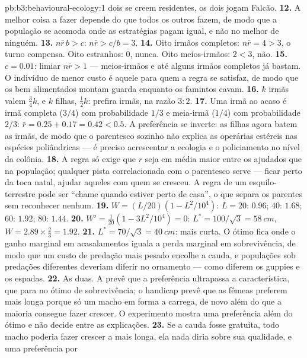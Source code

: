 \begin{solution}{pb:b3:behavioural-ecology:1}
dois se creem residentes, os dois jogam Falcão.
\textbf{12.} A melhor coisa a fazer depende do que todos os outros fazem,
de modo que a população se acomoda onde as estratégias pagam igual, e não
no melhor de ninguém.
\textbf{13.} $n\bar r\,b > c$: $n\bar r > c/b = 3$.
\textbf{14.} Oito irmãos completos: $n\bar r = 4 > 3$, o turno compensa.
Oito estranhos: $0$, nunca. Oito meios-irmãos: $2 < 3$, não.
\textbf{15.} $c = 0.01$: limiar $n\bar r > 1$ --- meios-irmãos e até
alguns irmãos completos já bastam. O indivíduo de menor custo é aquele
para quem a regra se satisfaz, de modo que os bem alimentados montam
guarda enquanto os famintos cavam.
\textbf{16.} $k$ irmãs valem $\tfrac{3}{4}k$, e $k$ filhas,
$\tfrac{1}{2}k$: prefira irmãs, na razão $3{:}2$.
\textbf{17.} Uma irmã ao acaso é irmã completa ($3/4$) com probabilidade
$1/3$ e meia-irmã ($1/4$) com probabilidade $2/3$: $\bar r = 0.25 +
0.17 = 0.42 < 0.5$. A preferência se inverte: as filhas agora batem as irmãs,
de modo que o parentesco sozinho não explica as operárias estéreis nas
espécies poliândricas --- é preciso acrescentar a ecologia e o
policiamento no nível da colônia.
\textbf{18.} A regra só exige que $r$ seja em média maior entre os
ajudados que na população; qualquer pista correlacionada com o parentesco
serve --- ficar perto da toca natal, ajudar aqueles com quem se cresceu.
A regra de um esquilo-terrestre pode ser ``chame quando estiver perto de
casa'', o que separa os parentes sem reconhecer nenhum.
\textbf{19.} $W = (L/20)(1 - L^{2}/10^{4})$: $L = 20$: $0.96$; $40$:
$1.68$; $60$: $1.92$; $80$: $1.44$.
\textbf{20.} $W' = \tfrac{1}{20}(1 - 3L^{2}/10^{4}) = 0$: $L^{*} = 100/\sqrt{3}
= \qty{58}{cm}$, $W = 2.89\times\tfrac{2}{3} = 1.92$.
\textbf{21.} $L^{*} = 70/\sqrt{3} = \qty{40}{cm}$: mais curta. O ótimo
fica onde o ganho marginal em acasalamentos iguala a perda marginal em
sobrevivência, de modo que um custo de predação mais pesado encolhe a
cauda, e populações sob predações diferentes deveriam diferir no ornamento
--- como diferem os guppies e os espadas.
\textbf{22.} As duas. A  prevê que a preferência
ultrapassa a característica, que para no ótimo de sobrevivência; o
handicap prevê que as fêmeas preferem mais longa porque só um macho em
forma a carrega, de novo além do que a maioria consegue fazer crescer. O
experimento mostra uma preferência além do ótimo e não decide entre as
explicações.
\textbf{23.} Se a cauda fosse gratuita, todo macho poderia fazer crescer
a mais longa, ela nada diria sobre sua qualidade, e uma preferência por

\end{solution}

